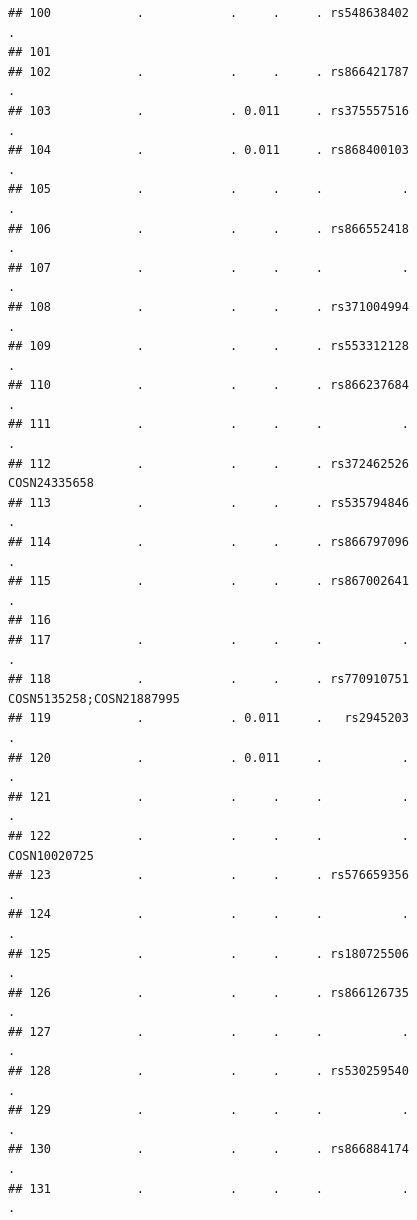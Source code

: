 \documentclass[
]{article}
\begin{document}
\begin{verbatim}
## 100            .            .     .     . rs548638402                        .
## 101                                                                           
## 102            .            .     .     . rs866421787                        .
## 103            .            . 0.011     . rs375557516                        .
## 104            .            . 0.011     . rs868400103                        .
## 105            .            .     .     .           .                        .
## 106            .            .     .     . rs866552418                        .
## 107            .            .     .     .           .                        .
## 108            .            .     .     . rs371004994                        .
## 109            .            .     .     . rs553312128                        .
## 110            .            .     .     . rs866237684                        .
## 111            .            .     .     .           .                        .
## 112            .            .     .     . rs372462526             COSN24335658
## 113            .            .     .     . rs535794846                        .
## 114            .            .     .     . rs866797096                        .
## 115            .            .     .     . rs867002641                        .
## 116                                                                           
## 117            .            .     .     .           .                        .
## 118            .            .     .     . rs770910751 COSN5135258;COSN21887995
## 119            .            . 0.011     .   rs2945203                        .
## 120            .            . 0.011     .           .                        .
## 121            .            .     .     .           .                        .
## 122            .            .     .     .           .             COSN10020725
## 123            .            .     .     . rs576659356                        .
## 124            .            .     .     .           .                        .
## 125            .            .     .     . rs180725506                        .
## 126            .            .     .     . rs866126735                        .
## 127            .            .     .     .           .                        .
## 128            .            .     .     . rs530259540                        .
## 129            .            .     .     .           .                        .
## 130            .            .     .     . rs866884174                        .
## 131            .            .     .     .           .                        .

\end{verbatim}
\end{document}
